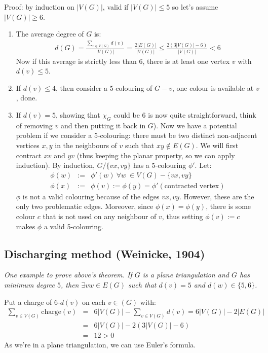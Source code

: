 		Proof: by induction on $|V(G)|$, valid if $|V(G)| \leq 5$ so let's assume $|V(G)| \geq 6$. 
		\begin{enumerate}
			\item The average degree of $G$ is:
				\begin{eqnarray}
					d(G) = \frac{\sum_{v \in V(G)} d(v)}{|V(G)|} = \frac{2 |E(G)|}{|V(G)|} \leq \frac{2 (3|V(G)| - 6)}{|V(G)|} < 6
				\end{eqnarray}
				Now if this average is strictly less than 6, there is at least one vertex $v$ with $d(v) \leq 5$.

			\item If $d(v) \leq 4$, then consider a 5-colouring of $G-v$, one colour is available at $v$, done.
			\item If $d(v) = 5$, showing that $\chi_{G}$ could be 6 is now quite straightforward, think of removing $v$ and then putting it back in $G$). Now we have a potential problem if we consider a 5-colouring: there must be two distinct non-adjacent vertices $x, y$ in the neighbours of $v$ such that $xy \notin E(G)$. We will first contract $xv$ and $yv$ (thus keeping the planar property, so we can apply induction). By induction, $G / \{ vx, vy \}$ has a 5-colouring $\phi'$. Let:
				\begin{eqnarray}
					\phi(w) &:=& \phi'(w) ~\forall w\ \in V(G) - \{ vx, vy \}\\
					\phi(x) &:=& \phi(v) := \phi(y) = \phi'(\text{contracted vertex})
				\end{eqnarray}
				$\phi$ is not a valid colouring because of the edges $vx, vy$. However, these are the only two problematic edges. Moreover, since $\phi(x) = \phi(y)$, there is some colour $c$ that is not used on any neighbour of $v$, thus setting $\phi(v) := c$ makes $\phi$ a valid 5-colouring.
		\end{enumerate}
		
		
		\subsection{Discharging method (Weinicke, 1904)}
		\textit{One example to prove above's theorem. If $G$ is a plane triangulation and $G$ has minimum degree $5$, then $\exists vw \in E(G)$ such that $d(v) = 5$ and $d(w) \in \{ 5, 6 \}$.\\}
		
		Put a charge of 6-$d(v)$ on each $v \in (G)$ with:
		\begin{eqnarray}
			\sum_{v \in V(G)} \text{charge}(v) &=& 6 |V(G)| - \sum_{v \in V(G)} d(v) = 6 |V(G)| - 2 |E(G)|\\
			&=& 6 |V(G)| - 2 (3|V(G)| - 6) \\
			&=& 12 > 0
		\end{eqnarray}
		As we're in a plane triangulation, we can use Euler's formula.\\
		
